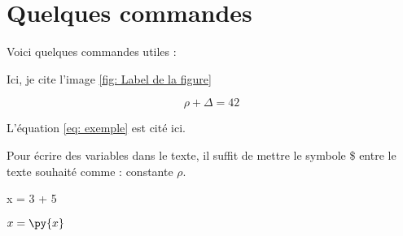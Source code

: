 \documentclass{rapport}
\begin{document}
\section{Quelques commandes}

Voici quelques commandes utiles :


Ici, je cite l'image \ref{fig: Label de la figure}



\begin{equation} \label{eq: exemple}
\rho + \Delta = 42
\end{equation}

L'équation \ref{eq: exemple} est cité ici. 


Pour écrire des variables dans le texte, il suffit de mettre le symbole \$ entre le texte souhaité comme : constante $\rho$.

\begin{pycode}
x = 3 + 5
\end{pycode}
       
$x = \py{x}$
       
\end{document}
